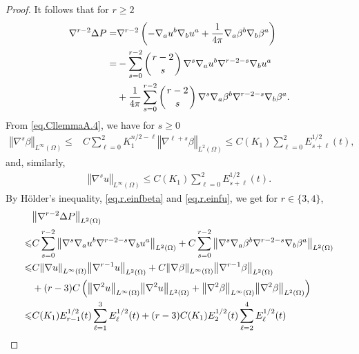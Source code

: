 \documentclass[12pt,reqno]{amsart}
\numberwithin{equation}{section}
\theoremstyle{definition}
\theoremstyle{remark}
\begin{document}
\begin{proof}
It follows that for $r{\geqslant} 2$
\begin{align*}
  {\nabla}^{r-2}\Delta {P }=&{\nabla}^{r-2}\left(-{\nabla}_a u^b{\nabla}_b u^a+\frac{1}{4\pi}{\nabla}_a \beta^b {\nabla}_b \beta^a\right)\\
  =&-\sum_{s=0}^{r-2}\left(r-2\atop s\right) {\nabla}^s{\nabla}_a u^b{\nabla}^{r-2-s}{\nabla}_b u^a\\
  &+\frac{1}{4\pi}\sum_{s=0}^{r-2}\left(r-2\atop s\right){\nabla}^s{\nabla}_a \beta^b{\nabla}^{r-2-s}{\nabla}_b \beta^a.
\end{align*}
From \eqref{eq.CllemmaA.4},  we have for $s{\geqslant} 0$
\begin{align}\label{eq.r.einfbeta}
  {\left\Vert{{\nabla}^s \beta}\right\Vert}_{L^\infty(\Omega)}{\leqslant} &C\sum_{\ell=0}^{2} K_1^{n/2-\ell}{\left\Vert{{\nabla}^{\ell+s}\beta}\right\Vert}_{L^2(\Omega)}
  {\leqslant} C(K_1)\sum_{\ell=0}^{2} E_{s+\ell}^{1/2}(t),
\end{align}
and, similarly,
\begin{align}\label{eq.r.einfu}
  {\left\Vert{{\nabla}^s u}\right\Vert}_{L^\infty(\Omega)}{\leqslant} C(K_1)\sum_{\ell=0}^{2} E_{s+\ell}^{1/2}(t).
\end{align}
By H\"older's inequality, \eqref{eq.r.einfbeta} and \eqref{eq.r.einfu}, we get for $r\in\{3,4\}$,
\begin{align}\label{eq.deltap34}
  &{\left\Vert{{\nabla}^{r-2}\Delta {P }}\right\Vert}_{L^2(\Omega)}{\nonumber}\\
  {\leqslant} &C\sum_{s=0}^{r-2} {\left\Vert{{\nabla}^s{\nabla}_a u^b{\nabla}^{r-2-s}{\nabla}_b u^a}\right\Vert}_{L^2(\Omega)}+C\sum_{s=0}^{r-2}{\left\Vert{{\nabla}^s{\nabla}_a \beta^b{\nabla}^{r-2-s}{\nabla}_b \beta^a}\right\Vert}_{L^2(\Omega)}{\nonumber}\\
  {\leqslant}&C{\left\Vert{{\nabla} u}\right\Vert}_{L^\infty(\Omega)}{\left\Vert{{\nabla}^{r-1} u}\right\Vert}_{L^2(\Omega)}+C{\left\Vert{{\nabla} \beta}\right\Vert}_{L^\infty(\Omega)}{\left\Vert{{\nabla}^{r-1} \beta}\right\Vert}_{L^2(\Omega)}{\nonumber}\\
  &+(r-3)C\left({\left\Vert{{\nabla}^{2} u}\right\Vert}_{L^\infty(\Omega)}{\left\Vert{{\nabla}^{2} u}\right\Vert}_{L^2(\Omega)}+{\left\Vert{{\nabla}^{2} \beta}\right\Vert}_{L^\infty(\Omega)}{\left\Vert{{\nabla}^{2} \beta}\right\Vert}_{L^2(\Omega)}\right){\nonumber}\\
  {\leqslant}& C(K_1)E_{r-1}^{1/2}(t)\sum_{\ell=1}^{3} E_{\ell}^{1/2}(t)+(r-3)C(K_1) E_{2}^{1/2}(t)\sum_{\ell=2}^{4} E_{\ell}^{1/2}(t){\nonumber}\\

\end{align}
\end{proof}
\end{document}
